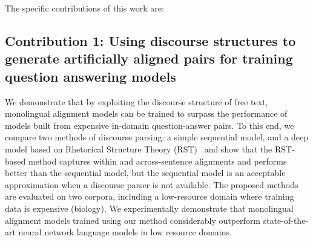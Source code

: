 The specific contributions of this work are:


\subsection{Contribution 1: Using discourse structures to generate artificially aligned pairs for training question answering models} 
We demonstrate that by exploiting the discourse structure of free text, monolingual alignment models can be trained to surpass the performance of models built from expensive in-domain question-answer pairs.  To this end, we compare two methods of discourse parsing: a simple sequential model, and a deep model based on Rhetorical Structure Theory (RST)~\citep{mann88} and show that the RST-based method captures within and across-sentence alignments and performs better than the sequential model, but the sequential model is an acceptable approximation when a discourse parser is not available.  The proposed methods are evaluated on two corpora, including a low-resource domain where training data is expensive (biology). We experimentally demonstrate that monolingual alignment models trained using our method considerably outperform state-of-the-art neural network language models in low resource domains.

